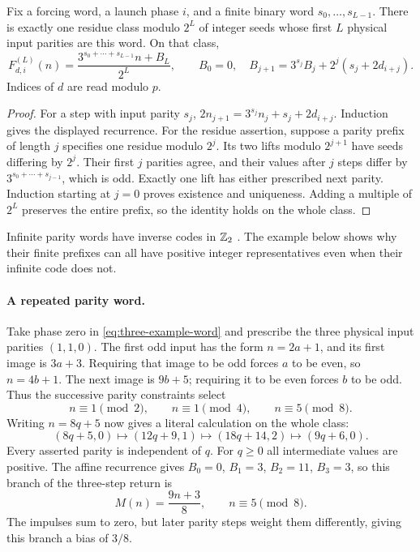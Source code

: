 \begin{proposition}\label{prop:affine-parity}
Fix a forcing word, a launch phase $i$, and a finite binary word
$s_0,\ldots,s_{L-1}$. There is exactly one residue class modulo $2^L$
of integer seeds whose first $L$ physical input parities are this word.
On that class,
\begin{equation}\label{eq:affine-word}
 F_{d,i}^{(L)}(n)=\frac{3^{s_0+\cdots+s_{L-1}}n+B_L}{2^L},
 \qquad B_0=0,\quad
 B_{j+1}=3^{s_j}B_j+2^j(s_j+2d_{i+j}).
\end{equation}
Indices of $d$ are read modulo $p$.
\end{proposition}
\begin{proof}
For a step with input parity $s_j$,
$2n_{j+1}=3^{s_j}n_j+s_j+2d_{i+j}$.
Induction gives the displayed recurrence. For the residue assertion,
suppose a parity prefix of length $j$ specifies one residue modulo
$2^j$. Its two lifts modulo $2^{j+1}$ have seeds differing by $2^j$.
Their first $j$ parities agree, and their values after $j$ steps
differ by $3^{s_0+\cdots+s_{j-1}}$, which is odd. Exactly one lift
has either prescribed next parity. Induction starting at $j=0$
proves existence and uniqueness. Adding a multiple of $2^L$
preserves the entire prefix, so the identity holds on the whole class.
\end{proof}

Infinite parity words have inverse codes in $\mathbb Z_2$
\cite{bernstein-1994,bernstein-lagarias-1996}. The example below
shows why their finite prefixes can all have positive integer
representatives even when their infinite code does not.

\paragraph{A repeated parity word.}
Take phase zero in \eqref{eq:three-example-word} and prescribe the
three physical input parities $(1,1,0)$. The first odd input has
the form $n=2a+1$, and its first image is $3a+3$. Requiring that
image to be odd forces $a$ to be even, so $n=4b+1$. The next image
is $9b+5$; requiring it to be even forces $b$ to be odd. Thus the
successive parity constraints select
\[
 n\equiv1\pmod2,\qquad n\equiv1\pmod4,\qquad
 n\equiv5\pmod8.
\]
Writing $n=8q+5$ now gives a literal calculation on the whole class:
\begin{equation}\label{eq:worked-affine-cylinder}
 (8q+5,0)\longmapsto(12q+9,1)
 \longmapsto(18q+14,2)\longmapsto(9q+6,0).
\end{equation}
Every asserted parity is independent of $q$. For $q\ge0$ all
intermediate values are positive. The affine recurrence gives
$B_0=0$, $B_1=3$, $B_2=11$, $B_3=3$, so this branch of the
three-step return is
\[
 M(n)=\frac{9n+3}{8},\qquad n\equiv5\pmod8.
\]
The impulses sum to zero, but later parity steps weight them
differently, giving this branch a bias of $3/8$.

